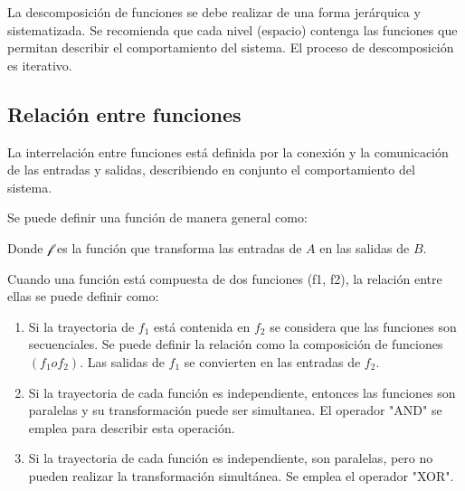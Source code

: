 La descomposición de funciones se debe realizar de una forma jerárquica y sistematizada. Se recomienda que cada nivel (espacio) contenga las funciones que permitan describir el comportamiento del sistema. El proceso de descomposición es iterativo.

\subsection{Relación entre funciones}

La interrelación entre funciones está definida por la conexión y la comunicación de las entradas y salidas, describiendo en conjunto el comportamiento del sistema.

Se puede definir una función de manera general como:

Donde \( \mathcal{f} \) es la función que transforma las entradas de \( A \) en las salidas de \( B \).

Cuando una función está compuesta de dos funciones (f1, f2), la relación entre ellas se puede definir como:
\begin{enumerate}
        \item Si la trayectoria de \( f_{1} \) está contenida en \( f_{2} \) se considera que las funciones son secuenciales. Se puede definir la relación como la composición de funciones \( (f_{1} o f_{2}) \). Las salidas de \( f_{1} \) se convierten en las entradas de \( f_{2} \).
        
        \item Si la trayectoria de cada función es independiente, entonces las funciones son paralelas y su transformación puede ser simultanea. El operador "AND" se emplea para describir esta operación.
        
        \item Si la trayectoria de cada función es independiente, son paralelas, pero no pueden realizar la transformación simultánea. Se emplea el operador "XOR".
\end{enumerate}
